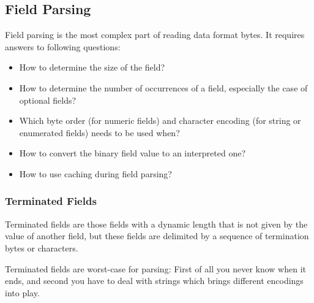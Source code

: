 \subsection{Field Parsing}%
\label{sec:FieldParsing}%

Field parsing is the most complex part of reading data format bytes. It requires answers to following questions:
\begin{itemize}
\item How to determine the size of the field?
\item How to determine the number of occurrences of a field, especially the case of optional fields?
\item Which byte order (for numeric fields) and character encoding (for string or enumerated fields) needs to be used when?
\item How to convert the binary field value to an interpreted one?
\item How to use caching during field parsing?
\end{itemize}

\subsubsection{Terminated Fields}%
\label{sec:TerminatedFields}%

Terminated fields are those fields with a dynamic length that is not given by the value of another field, but these fields are delimited by a sequence of termination bytes or characters. 

Terminated fields are worst-case for parsing: First of all you never know when it ends, and second you have to deal with strings which brings different encodings into play.

